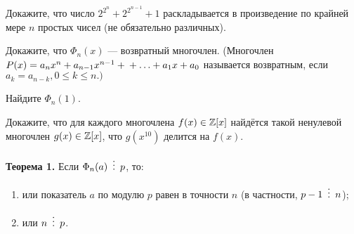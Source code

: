 \documentclass{article}
\begin{document}
\begin{enumerate_boxed}
        \item Докажите, что число $2^{2^n} + 2^{2^{n-1}} + 1$ раскладывается в произведение по крайней мере $n$ простых чисел (не обязательно различных).

        \item Докажите, что $\Phi_n(x)$ --- возвратный многочлен.
        (Многочлен $P(x) = a_{n}x^n + a_{n-1}x^{n-1} + \\ + \ldots + a_{1}x + a_0$ называется возвратным, если $a_k = a_{n-k}, 0 \leq k \leq n.)$

        \item Найдите $\Phi_n(1)$.

        \item Докажите, что для каждого многочлена $f(x) \in \mathbb{Z}[x]$ найдётся такой ненулевой многочлен $g(x) \in \mathbb{Z}[x]$, что $g(x^{10})$ делится на $f(x)$.

    \end{enumerate_boxed}

    \textbf{Теорема 1.} Если $\Phi_n(a) \,\,\,\vdots\,\,\, p$, то:
    \begin{enumerate}[label*=$\bullet$]
        \item или показатель $a$ по модулю $p$ равен в точности $n$ (в частности, $p-1 \,\,\,\vdots\,\,\, n$);

        \item или $n \,\,\,\vdots\,\,\, p$.
    \end{enumerate}
\end{document}
